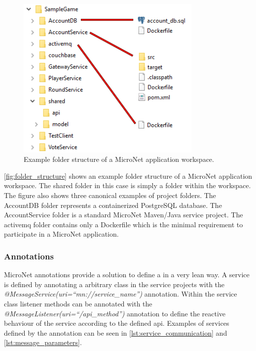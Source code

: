 \begin{figure}
	\centering
	\includegraphics[width=9cm]{images/tools/folder_structure}
	\caption{Example folder structure of a MicroNet application workspace.}
	\label{fig:folder_structure}
\end{figure}

\autoref{fig:folder_structure} shows an example folder structure of a MicroNet
application workspace. The shared folder in this case is simply a folder within the
workspace. The figure also shows three canonical examples of project folders.
The AccountDB folder represents a containerized PostgreSQL database. The
AccountService folder is a standard MicroNet Maven/Java service project. The
activemq folder contains only a Dockerfile which is the minimal requirement to
participate in a MicroNet application.

\subsubsection{Annotations}

MicroNet annotations provide a solution to define a \ms{} in a very lean way.
A service is defined by annotating a arbitrary class in the service projects
with the \textit{@MessageService(uri=``mn://service\_name'')} annotation. Within
the service class listener methods can be annotated with the
\textit{@MessageListener(uri=``/api\_method'')} annotation to define the
reactive behaviour of the service according to the defined \gls{api}. Examples of
services defined by the annotation can be seen in
\autoref{lst:service_communication} and \autoref{lst:message_parameters}.

